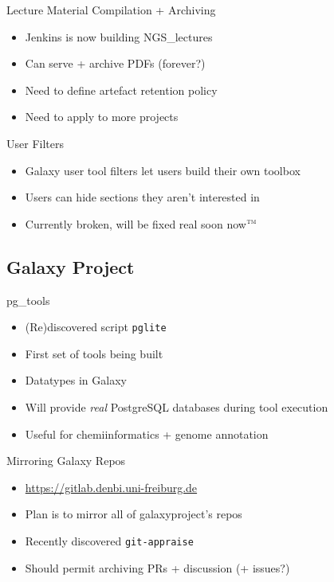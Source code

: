 \documentclass[12pt]{ufrslides}
\begin{document}
	\begin{frame}{Lecture Material Compilation + Archiving}
		\begin{itemize}
			\item Jenkins is now building NGS\_lectures
			\item Can serve + archive PDFs (forever?)
			\item Need to define artefact retention policy
			\item Need to apply to more projects
		\end{itemize}
	\end{frame}

	\begin{frame}{User Filters}
		\begin{itemize}
			\item Galaxy user tool filters let users build their own toolbox
			\item Users can hide sections they aren't interested in
			\item Currently broken, will be fixed real soon now$^{\text{\tiny \sc{TM}}}$
		\end{itemize}
	\end{frame}

\subsection{Galaxy Project}

	\begin{frame}{pg\_tools}
		\begin{itemize}
			\item (Re)discovered script \texttt{pglite}
			\item First set of tools being built
			\item Datatypes in Galaxy
			\item Will provide \emph{real} PostgreSQL databases during tool execution
			\item Useful for chemiinformatics + genome annotation
		\end{itemize}
	\end{frame}

	\begin{frame}{Mirroring Galaxy Repos}
		\begin{itemize}
			\item \url{https://gitlab.denbi.uni-freiburg.de}
			\item Plan is to mirror all of galaxyproject's repos
			\item Recently discovered \texttt{git-appraise}
			\item Should permit archiving PRs + discussion (+ issues?)
		\end{itemize}
	\end{frame}
\end{document}

